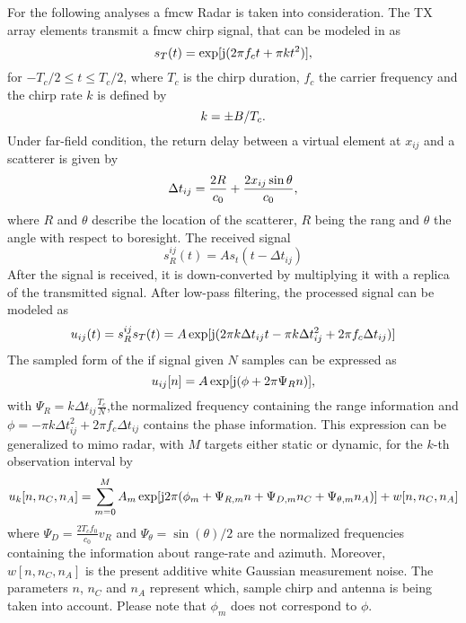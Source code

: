 For the following analyses a \Ac{fmcw} Radar is taken into consideration. The TX array elements transmit a \Ac{fmcw} chirp signal, that can be modeled in as
\begin{equation}
	s_T(t) = \exp[\mathrm{j}(2\pi f_ct+\pi kt^2)]\\,
\end{equation}
for $-T_c/2 \leq t \leq T_c/2$, where $T_c$ is the chirp duration, $f_c$ the carrier frequency and the chirp rate $k$ is defined by
\begin{equation}
	k = \pm B/T_c\\.
\end{equation}
Under far-field condition, the return delay between a virtual element at $x_{ij}$ and a scatterer is given by
\begin{equation}
	\Delta t_{ij} = \frac{2R}{c_0} + \frac{2x_{ij}\sin\theta}{c_0}\\,
\end{equation}
where $R$ and $\theta$ describe the location of the scatterer, $R$ being the rang and $\theta$ the angle with respect to boresight. The received signal 
\begin{equation}
	s_R^{ij}(t) = As_t(t-\Delta t_{ij})
\end{equation}
After the signal is received, it is down-converted by multiplying it with a replica of the transmitted signal. After low-pass filtering, the processed signal can be modeled as 
\begin{equation}
	u_{ij}(t) = s_R^{ij}s_T(t) = A\exp[\mathrm{j}(2\pi k \Delta t_{ij}t-\pi k\Delta  t_{ij}^2 + 2\pi f_c \Delta t_{ij})]
\end{equation}
The sampled form of the \ac{if} signal given $N$ samples can be expressed as
\begin{equation}
	u_{ij}[n] = A\exp[\mathrm{j}(\phi+2\pi\Psi_R n)]\\,
\end{equation}
with $\Psi_R = k\Delta t_{ij}\frac{T_c}{N} $,the normalized frequency containing the range information and $\phi = -\pi k\Delta  t_{ij}^2 + 2\pi f_c \Delta t_{ij} $ contains the phase information. This expression can be generalized to \ac{mimo} radar, with $M$ targets either static or dynamic, for the $k$-th observation interval by
\begin{equation}\label{eq:signal}
	u_{k}[n,n_C,n_A] = \sum_{m=0}^{M}A_m\exp[\mathrm{j}2\pi(\phi_m+\Psi_{R,m}n+\Psi_{D,m}n_C+\Psi_{\theta,m}n_A)] + w[n,n_C,n_A]
\end{equation}
where $\Psi_D = \frac{2T_cf_0}{c_0}v_R$ and $\Psi_\theta =\sin(\theta)/2 $ are the normalized frequencies containing the information about range-rate and azimuth. Moreover, $w[n,n_C,n_A]$ is the present additive white Gaussian measurement noise. The parameters $n$, $n_C$ and $n_A$ represent which, sample chirp and antenna is being taken into account. Please note that $\phi_m$ does not correspond to $\phi$.

